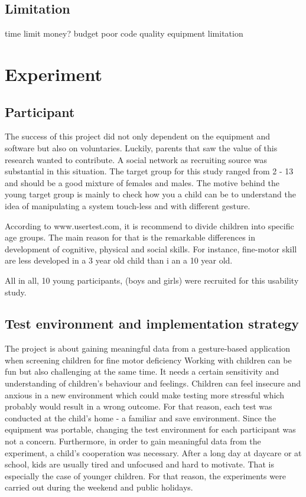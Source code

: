 \subsection{Limitation}
time limit
money? budget
poor code quality
equipment limitation

\section{Experiment }
\label{sec:experiment}


\subsection{Participant}
\label{sec:participant}

The success of this project did not only dependent on the equipment and software but also on voluntaries. Luckily,  parents that saw the value of this research wanted to contribute. A social network as recruiting source was substantial in this situation. The target group for this study ranged from 2 - 13 and should be a good mixture of females and males.
The motive behind the young target group is mainly to check how you a child can be to understand the idea of manipulating a system touch-less and with different gesture. 

According to www.usertest.com, it is recommend to divide children into specific age groups. The main reason for that is the remarkable differences in development of cognitive, physical and social skills. For instance, fine-motor skill are less developed in a 3 year old child than i an a 10 year old.

All in all, 10 young participants, (boys and girls) were recruited for this usability study.


\subsection{Test environment and implementation strategy}
\label{sec:environmnent}

The project is about gaining meaningful data from a gesture-based application when screening children for fine motor deficiency
Working with children can be fun but also challenging at the same time. It needs a certain sensitivity and understanding of children's behaviour and feelings. Children can feel insecure  and anxious in a new environment which could make testing more stressful which probably would result in a wrong outcome. For that reason, each test was conducted at the child's home - a familiar and save environment. Since the equipment was portable, changing the test environment for each participant was not a concern.
Furthermore, in order to gain meaningful data from the experiment, a child's cooperation was necessary.  After a long day at daycare or at school, kids are usually tired and unfocused and hard to motivate. That is especially the case of younger children. For that reason, the experiments were carried out during the weekend and public holidays.  

